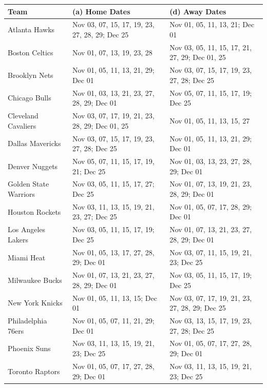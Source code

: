 \documentclass[11pt, letterpaper]{article}
\begin{document}
\begingroup
\small
\setlength{\tabcolsep}{4pt}
\begin{longtable}{p{3.2cm} p{6.8cm} p{5.2cm}}
\toprule
\textbf{Team} & \textbf{(a) Home Dates} & \textbf{(d) Away Dates} \\
\midrule
\endhead
\bottomrule
\endfoot
Atlanta Hawks       & Nov 03, 07, 15, 17, 19, 23, 27, 28, 29; Dec 25 & Nov 01, 05, 11, 13, 21; Dec 01 \\[2pt]
Boston Celtics      & Nov 01, 07, 13, 19, 23, 28 & Nov 03, 05, 11, 15, 17, 21, 27, 29; Dec 01, 25 \\[2pt]
Brooklyn Nets       & Nov 01, 05, 11, 13, 21, 29; Dec 01 & Nov 03, 07, 15, 17, 19, 23, 27, 28; Dec 25 \\[2pt]
Chicago Bulls       & Nov 01, 03, 13, 21, 23, 27, 28, 29; Dec 01 & Nov 05, 07, 11, 15, 17, 19; Dec 25 \\[2pt]
Cleveland Cavaliers & Nov 03, 07, 17, 19, 21, 23, 28, 29; Dec 01, 25 & Nov 01, 05, 11, 13, 15, 27 \\[2pt]
Dallas Mavericks    & Nov 03, 07, 15, 17, 19, 23, 27, 28; Dec 25 & Nov 01, 05, 11, 13, 21, 29; Dec 01 \\[2pt]
Denver Nuggets      & Nov 05, 07, 11, 15, 17, 19, 21; Dec 25 & Nov 01, 03, 13, 23, 27, 28, 29; Dec 01 \\[2pt]
Golden State Warriors & Nov 03, 05, 11, 15, 17, 27; Dec 25 & Nov 01, 07, 13, 19, 21, 23, 28, 29; Dec 01 \\[2pt]
Houston Rockets     & Nov 03, 11, 13, 15, 19, 21, 23, 27; Dec 25 & Nov 01, 05, 07, 17, 28, 29; Dec 01 \\[2pt]
Los Angeles Lakers  & Nov 03, 05, 11, 15, 17, 19; Dec 25 & Nov 01, 07, 13, 21, 23, 27, 28, 29; Dec 01 \\[2pt]
Miami Heat          & Nov 01, 05, 13, 17, 27, 28, 29; Dec 01 & Nov 03, 07, 11, 15, 19, 21, 23; Dec 25 \\[2pt]
Milwaukee Bucks     & Nov 01, 07, 13, 21, 23, 27, 28, 29; Dec 01 & Nov 03, 05, 11, 15, 17, 19; Dec 25 \\[2pt]
New York Knicks     & Nov 01, 05, 11, 13, 15; Dec 01 & Nov 03, 07, 17, 19, 21, 23, 27, 28, 29; Dec 25 \\[2pt]
Philadelphia 76ers  & Nov 01, 05, 07, 11, 21, 29; Dec 01 & Nov 03, 13, 15, 17, 19, 23, 27, 28; Dec 25 \\[2pt]
Phoenix Suns        & Nov 03, 11, 13, 15, 19, 21, 23; Dec 25 & Nov 01, 05, 07, 17, 27, 28, 29; Dec 01 \\[2pt]
Toronto Raptors     & Nov 01, 05, 07, 17, 27, 28, 29; Dec 01 & Nov 03, 11, 13, 15, 19, 21, 23; Dec 25 \\
\end{longtable}
\endgroup
\end{document}
